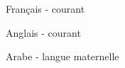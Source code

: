 \begin{cventries}
  \cventry
    {}
    {}
    {}
    {}
    {
      \begin{cvitems}
        \item {Français - courant}
        \item {Anglais - courant}
        \item {Arabe - langue maternelle}
      \end{cvitems}
    }
\end{cventries}
